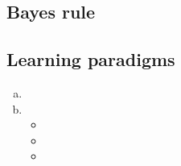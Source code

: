 \documentclass[11pt,a4paper]{article}
\begin{document}
\subsection{Bayes rule}

\subsection{Learning paradigms}

\begin{enumerate}[a)]

\item

\item \begin{itemize}

\item

\item

\item

\end{itemize}

\end{enumerate}
\end{document}
